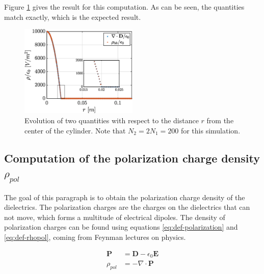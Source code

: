 \documentclass[a4paper,12pt,twoside]{article}
\newcommand{\mbf}[1]{\mathbf{#1}} %
\newcommand{\Div}[1]{\nabla\cdot\mathbf{#1}}
\begin{document}
  Figure \ref{fig:d2} gives the result for this computation.
  As can be seen, the quantities match exactly, which is the expected result.


  \begin{figure}[h]
    \centering
    \includegraphics[width=0.5\textwidth]{graphs/exd2-diff.eps}
    \caption{Evolution of two quantities with respect to the distance $r$ from the center of the cylinder. Note that $N_2=2N_1=200$ for this simulation.} %
    \label{fig:d2}
  \end{figure}

  \subsection{Computation of the polarization charge density $\rho_{pol}$} \label{sec:rhopol}
    The goal of this paragraph is to obtain the polarization charge density of the dielectrics.
    The polarization charges are the charges on the dielectrics that can not move, which forms a multitude of electrical dipoles. \cite{feynman:dielectrics}
    The density of polarization charges can be found using equations \eqref{eq:def-polarization} and \eqref{eq:def-rhopol}, coming from Feynman lectures on physics. \cite{feynman:dielectrics}

    \begin{align}
      \mbf{P} &= \mbf{D} - \epsilon_0\mbf{E}
      \label{eq:def-polarization} \\
      \rho_{pol} &= -\Div{\mbf{P}}
      \label{eq:def-rhopol}
    \end{align}
\end{document}
